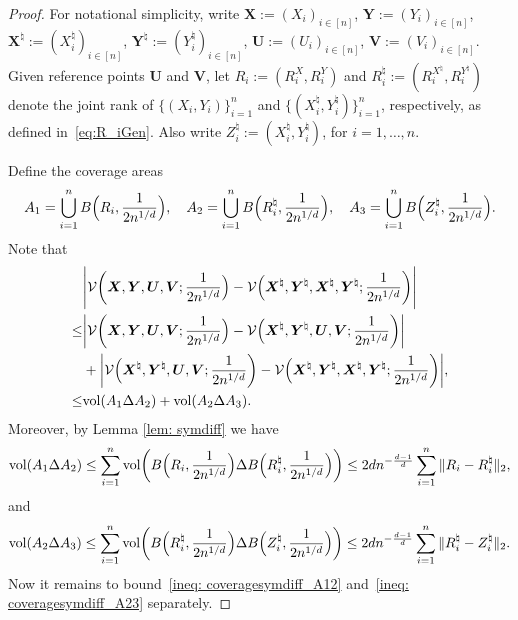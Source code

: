 \documentclass[11pt]{article}
\newcommand{\bs}[1]{\boldsymbol{#1}}
\begin{document}
\begin{proof}
For notational simplicity, write $\bs{X}:=(X_i)_{i\in[n]}$, $\bs{Y}:=(Y_i)_{i\in[n]}$, ${\bs{X}^\natural}:=( X_i^\natural)_{i\in[n]}$, ${\bs Y^\natural} :=( Y_i^\natural)_{i\in[n]}$, $\bs{U}:=(U_i)_{i\in[n]}$, $\bs{V}:=(V_i)_{i\in[n]}$. Given reference points ${\bs U}$ and ${\bs V}$, let $R_i:= (R_i^X, R_i^Y)$ and $ R_i^\natural := ({R}_i^{X^\natural}, {R}_i^{Y^\natural})$ denote the joint rank of $\{(X_i, Y_i)\}_{i = 1}^n$ and $\{({X}_i^\natural, {Y}_i^\natural)\}_{i = 1}^n$, respectively, as defined in~\eqref{eq:R_iGen}. Also write $Z_i^\natural := ( X_i^\natural,  Y_i^\natural)$, for $i = 1, \ldots, n$. 

Define the coverage areas
\[
A_1 = \bigcup_{i = 1}^n B\Bigl(R_i, \frac{1}{2n^{1/d}}\Bigr), \quad {A}_2 = \bigcup_{i=1}^n B\Bigl({R}_i^\natural, \frac{1}{2n^{1/d}}\Bigr), \quad {A}_3 = \bigcup_{i=1}^n B\Bigl(Z_i^\natural, \frac{1}{2n^{1/d}}\Bigr).
\]
Note that  
\begin{align}
     &\Biggl|\mathcal{V}\biggl(\bs{X}, \bs{Y}, \bs{U}, \bs{V}; \frac{1}{2n^{1/d}} \Bigr) - \mathcal{V}\Bigl({\bs X^\natural}, {\bs Y^\natural}, {\bs X^\natural}, {\bs Y^\natural}; \frac{1}{2n^{1/d}}\biggr)\Biggr| \notag \\
     \leq & \biggl|\mathcal{V}\biggl(\bs{X}, \bs{Y}, \bs{U}, \bs{V}; \frac{1}{2n^{1/d}} \Bigr) - \mathcal{V}\Bigl({\bs X^\natural}, {\bs Y^\natural}, \bs{U}, \bs{V}; \frac{1}{2n^{1/d}}\biggr)\biggr| \notag \\ 
     &+ \biggl|\mathcal{V}\Bigl({\bs X^\natural}, {\bs Y^\natural}, \bs{U}, \bs{V}; \frac{1}{2n^{1/d}}\biggr) - \mathcal{V}\Bigl({\bs X^\natural}, {\bs Y^\natural}, {\bs X^\natural}, {\bs Y^\natural}; \frac{1}{2n^{1/d}}\biggr)\biggr|, \notag \\
     \leq & \mathrm{vol}(A_1\Delta {A}_2) + \mathrm{vol}(A_2\Delta {A}_3) \label{ineq: vacancydiff}.
\end{align}
Moreover, by Lemma \ref{lem: symdiff} we have
\begin{align}
\mathrm{vol}(A_1\Delta {A}_2) \leq \sum_{i = 1}^n \mathrm{vol}\biggl(B\Bigl(R_i, \frac{1}{2n^{1/d}}\Bigr) \Delta B\Bigl({R}_i^\natural, \frac{1}{2n^{1/d}}\Bigr)\biggr) 
\leq2 d n^{-\frac{d-1}{d}} \sum_{i = 1}^n  \|R_i - {R}_i^\natural\|_2 \label{ineq: coveragesymdiff_A12},  
\end{align}
and
\begin{align}
  \mathrm{vol}(A_2\Delta {A}_3) \leq \sum_{i = 1}^n \mathrm{vol}\biggl(B\Bigl( R_i^\natural, \frac{1}{2n^{1/d}}\Bigr) \Delta B\Bigl(Z_i^\natural, \frac{1}{2n^{1/d}}\Bigr)\biggr) 
\leq2 d n^{-\frac{d-1}{d}} \sum_{i = 1}^n  \| R_i^\natural - {Z}_i^\natural\|_2 \label{ineq: coveragesymdiff_A23}.
\end{align}
Now it remains to bound~\eqref{ineq: coveragesymdiff_A12} and~\eqref{ineq: coveragesymdiff_A23} separately. 


\end{proof}
\end{document}
